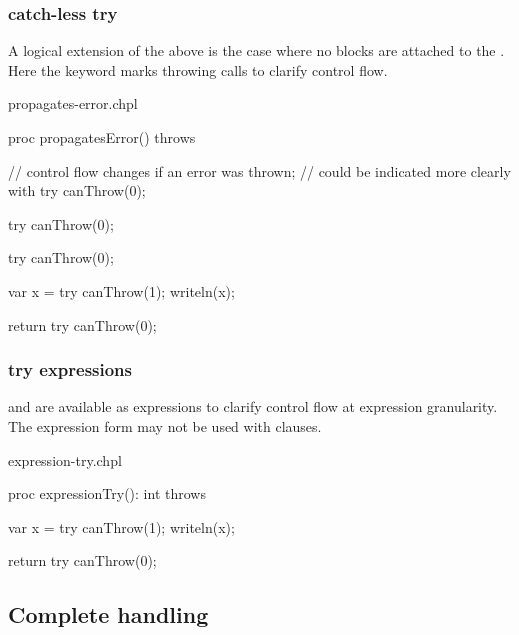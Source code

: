 \subsubsection{catch-less try}
\label{catch_less_try}

A logical extension of the above is the case where no  blocks
are attached to the . Here the  keyword marks throwing
calls to clarify control flow.

\begin{chapelexample}{propagates-error.chpl}
\begin{chapel}
proc propagatesError() throws {
  // control flow changes if an error was thrown;
  // could be indicated more clearly with try
  canThrow(0);

  try canThrow(0);

  try {
    canThrow(0);
  }

  var x = try canThrow(1);
  writeln(x);

  return try canThrow(0);
}
\end{chapel}
\begin{chapelpost}
\end{chapelpost}
\begin{chapeloutput}
\end{chapeloutput}
\end{chapelexample}

\subsubsection{try expressions}
\label{try_expressions}

 and  are available as expressions to clarify control flow
at expression granularity. The expression form may not be used with
 clauses.

\begin{chapelexample}{expression-try.chpl}
\begin{chapel}
proc expressionTry(): int throws {
  var x = try canThrow(1);
  writeln(x);

  return try canThrow(0);
}
\end{chapel}
\begin{chapelpost}
\end{chapelpost}
\begin{chapeloutput}
\end{chapeloutput}
\end{chapelexample}

\subsection{Complete handling}
\label{Complete_handling}

